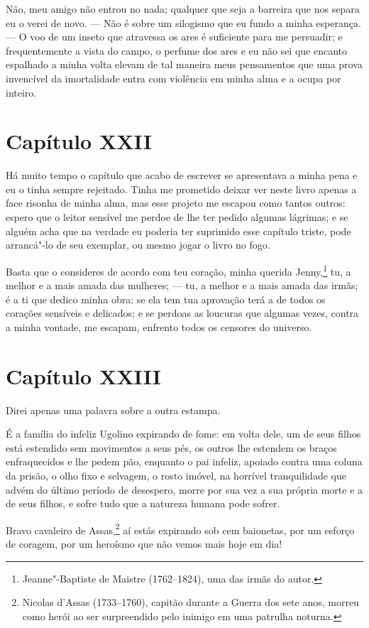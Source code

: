  Não, meu amigo não entrou no nada; qualquer que seja a barreira que nos
separa eu o verei de novo. --- Não é sobre um silogismo que eu fundo a
minha esperança. --- O voo de um inseto que atravessa os ares é
suficiente para me persuadir; e frequentemente a vista do campo, o
perfume dos ares e eu não sei que encanto espalhado a minha volta
elevam de tal maneira meus pensamentos que uma prova invencível da
imortalidade entra com violência em minha alma e a ocupa por inteiro.

\section*{Capítulo XXII}

Há muito tempo o capítulo que acabo de escrever se apresentava a minha
pena e eu o tinha sempre rejeitado. Tinha me prometido deixar ver neste
livro apenas a face risonha de minha alma, mas esse projeto me escapou
como tantos outros: espero que o leitor sensível me perdoe de lhe ter
pedido algumas lágrimas; e se alguém acha que na verdade eu poderia ter
suprimido esse capítulo triste, pode arrancá"-lo de seu exemplar, ou
mesmo jogar o livro no fogo. 

Basta que o consideres de acordo com teu coração, minha querida
Jenny,\footnote{ Jeanne"-Baptiste de Maistre (1762--1824), uma das irmãs
do autor.} tu, a melhor e a mais amada das mulheres; --- tu, a
melhor e a mais amada das irmãs; é a ti que dedico minha obra: se ela
tem tua aprovação terá a de todos os corações sensíveis e delicados; e
se perdoas as loucuras que algumas vezes, contra a minha vontade, me
escapam, enfrento todos os censores do universo. 

\section*{Capítulo XXIII}

 Direi apenas uma palavra sobre a outra estampa.

 É a família do infeliz Ugolino expirando de fome: em volta dele, um de
seus filhos está estendido sem movimentos a seus pés, os outros lhe
estendem os braços enfraquecidos e lhe pedem pão, enquanto o pai
infeliz, apoiado contra uma coluna da prisão, o olho fixo e selvagem, o
rosto imóvel, na horrível tranquilidade que advém do último período de
desespero, morre por sua vez a sua própria morte e a de seus filhos, e
sofre tudo que a natureza humana pode sofrer.

 Bravo cavaleiro de Assas,\footnote{ Nicolas d’Assas (1733--1760), capitão
durante a Guerra dos sete anos, morreu como herói ao ser surpreendido pelo
inimigo em uma patrulha noturna.} aí estás expirando sob cem
baionetas, por um esforço de coragem, por um heroísmo que não vemos
mais hoje em dia!

